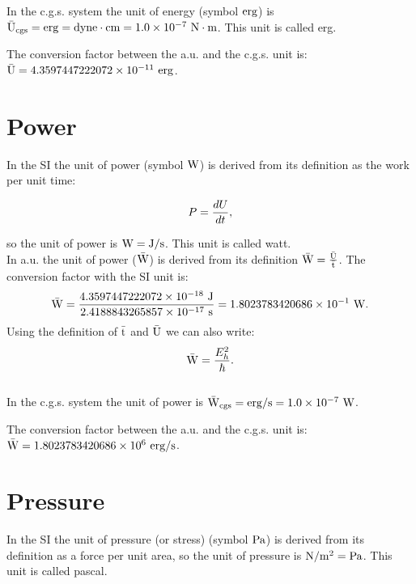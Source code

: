 \documentclass[12pt,a4paper,twoside]{report}
\def\bart{2.4188843265857\times 10^{-17}}
\def\baru{4.3597447222072\times 10^{-18}}
\def\barw{1.8023783420686\times 10^{-1}}
\def\utou{1.0\times 10^{-7}}
\def\barucgs{4.3597447222072\times 10^{-11}}
\def\barwcgs{1.8023783420686\times 10^{6}}
\begin{document}
{\color{orange} In the c.g.s. system the unit of energy (symbol ${\rm erg}$)
is ${\rm \bar U_{cgs}}={\rm erg}={\rm dyne}\cdot {\rm cm} = \utou\ {\rm N}\cdot {\rm m}$. This unit is 
called erg.
\\
}

{\color{green} The conversion factor between the a.u. and the c.g.s. unit is:
${\rm \bar U}=\barucgs\ {\rm erg}$.
\\
}

\newpage
{\color{coral}\section{Power}}
\color{black}
In the SI the unit of power (symbol ${\rm W}$) is derived from its
definition as the work per unit time: 

\begin{tcolorbox}
\begin{equation}
P= {d U \over d t},
\end{equation} 
\end{tcolorbox}

so the unit of power is ${\rm W}={\rm J}/{\rm s}$. This unit is called watt.
\\

{\color{web-blue} In a.u. the unit of power (${\rm \bar W}$) is derived 
from its definition ${\rm \bar W} ={{\rm \bar U} \over {\rm \bar t}}$. The
conversion factor with the SI unit is: 
\begin{equation}
{\rm \bar W} = {\baru\ {\rm J}\over \bart\ {\rm s}}=\barw\ {\rm W}. 
\end{equation}
Using the definition of ${\rm \bar t}$ and ${\rm \bar U}$ we can also write:
\begin{equation}
{\rm \bar W} = {E_h^2 \over \hbar}.
\end{equation}
}
\\

{\color{orange} In the c.g.s. system the unit of power is 
${\rm \bar W_{cgs}} = {\rm erg}/{\rm s} = \utou\ {\rm W}$. 
\\
}

{\color{green} The conversion factor between the a.u. and the c.g.s. unit is:
${\rm \bar W}=\barwcgs\ {\rm erg}/{\rm s}$.
}

\newpage
{\color{coral}\section{Pressure}}
\color{black}
In the SI the unit of pressure (or stress) (symbol ${\rm Pa}$) is derived 
from its definition as a force per unit area, so 
the unit of pressure is ${\rm N}/{\rm m}^2={\rm Pa}$. This unit is called 
pascal.
\\
\end{document}
